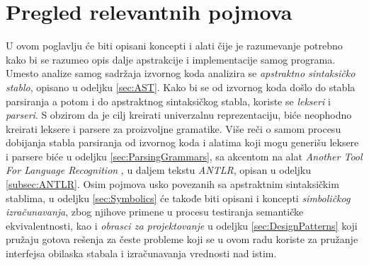 \chapter{Pregled relevantnih pojmova}
\label{chp:RelevantTerms}

U ovom poglavlju će biti opisani koncepti i alati čije je razumevanje potrebno kako bi se razumeo opis dalje apstrakcije i implementacije samog programa. Umesto analize samog sadržaja izvornog koda analizira se \emph{apstraktno sintaksičko stablo}, opisano u odeljku \ref{sec:AST}. Kako bi se od izvornog koda došlo do stabla parsiranja a potom i do apstraktnog sintaksičkog stabla, koriste se \emph{lekseri} i \emph{parseri}. S obzirom da je cilj kreirati univerzalnu reprezentaciju, biće neophodno kreirati leksere i parsere za proizvoljne gramatike. Više reči o samom procesu dobijanja stabla parsiranja od izvornog koda i alatima koji mogu generišu leksere i parsere biće u odeljku \ref{sec:ParsingGrammars}, sa akcentom na alat \emph{Another Tool For Language Recognition} \cite{ANTLR}, u daljem tekstu \emph{ANTLR}, opisan u odeljku \ref{subsec:ANTLR}. Osim pojmova usko povezanih sa apstraktnim sintaksičkim stablima, u odeljku \ref{sec:Symbolics} će takođe biti opisani i koncepti \emph{simboličkog izračunavanja}, zbog njihove primene u procesu testiranja semantičke ekvivalentnosti, kao i \emph{obrasci za projektovanje} u odeljku \ref{sec:DesignPatterns} koji pružaju gotova rešenja za česte probleme koji se u ovom radu koriste za pružanje interfejsa obilaska stabala i izračunavanja vrednosti nad istim.






